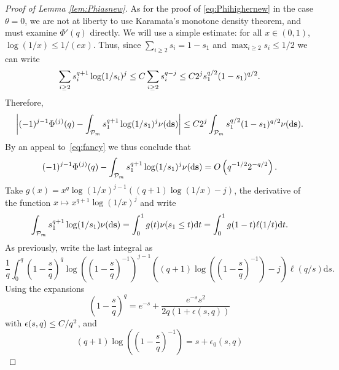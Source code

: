 \documentclass[a4,12pt]{amsart}
\numberwithin{equation}{section}
\newcommand{\MassP}{\mathcal{P}_{\rm m}}
\newcommand{\const}{{\rm C}} %
\begin{document}
\begin{appendix}
\begin{proof}[Proof of Lemma \ref{lem:Phiasnew}]
As for the proof of \eqref{eq:Phihighernew} in the case $\theta = 0$, we are not at liberty to use Karamata's monotone density theorem, and must examine $\Phi'(q)$ directly. 
		We will use a simple estimate:
		for all $x \in (0,1)$,
		$\log(1/x) \leq 1/(ex)$. 
		Thus, since $\sum_{i\geq 2}s_i = 1-s_1$ and $\max_{i \geq 2}s_i \leq 1/2$ we can write
		\begin{equation*}
			\sum_{i \geq 2} s_i^{q+1}\log(1/s_i)^j
			\leq \const \sum_{i \geq 2} s_i^{q-j}
			\leq \const 2^{j} s_1^{q/2}(1-s_1)^{q/2}.
		\end{equation*}
		Therefore,
		\begin{equation*}
			\left| (-1)^{j-1}\Phi^{(j)}(q) - \int_{\MassP} s_1^{q+1}\log(1/s_1)^j  \nu(\mathrm{d} \mathbf{s}) \right|
			\leq \const 2^{j}\int_{\MassP}
			s_1^{q/2}(1-s_1)^{q/2} \nu(\mathrm{d} \mathbf{s}).
		\end{equation*}
        By an appeal to~\eqref{eq:fancy} we thus conclude that
		\begin{equation*}
			(-1)^{j-1}\Phi^{(j)}(q) - \int_{\MassP} s_1^{q+1}\log(1/s_1)^j  \nu(\mathrm{d} \mathbf{s}) 
			= O \left(q^{-1/2}2^{-q/2} \right).
		\end{equation*}
		Take $g(x) = x^q \log(1/x)^{j-1} ((q+1) \log(1/x)-j)$, the derivative of the function $x \mapsto x^{q+1}\log(1/x)^j$ and write
		\begin{equation*}
			\int_{\MassP} s_1^{q+1} \log(1/s_1) \nu(\mathrm{d} \mathbf{s}) =
			\int_0^1 g(t) \nu(s_1 \leq t) \mathrm{d} t =
			\int_0^1 g(1-t) \ell(1/t) \mathrm{d} t.
		\end{equation*}
		As previously, write the last integral as
		\begin{equation*}
			\frac{1}{q}
			\int_0^q \left(1-\frac sq \right)^q \log\left(\left(1-\frac sq \right)^{-1}\right)^{j-1}
			\left( (q+1)\log\left(\left(1-\frac sq \right)^{-1}\right) -j \right) \ell(q/s) \mathrm{d} s.
		\end{equation*}
		Using the expansions 
		\[
			\left(1-\frac{s}{q}\right)^q = e^{-s}+\frac{e^{-s}s^2}{2q(1+\epsilon(s,q))}	
        \]
		with $\epsilon(s,q)\leq \const/ q^2$, and
		\begin{equation*}
			(q+1)\log\left(\left(1-\frac sq \right)^{-1}\right) = s + \epsilon_0(s,q)

\end{equation*}
\end{proof}
\end{appendix}
\end{document}
